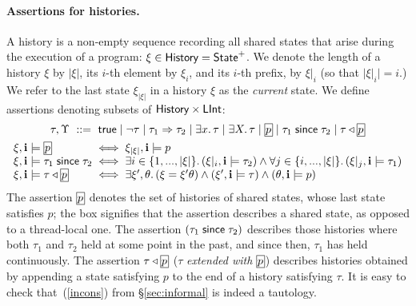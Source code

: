 \paragraph{Assertions for histories.}  A history is a non-empty sequence
recording all shared states that arise during the execution of a program: $\xi
\in \textsf{History} = {\sf State}^+$.  We denote the length of a history $\xi$ by $|\xi|$,
its $i$-th element by $\xi_i$, and its $i$-th prefix, by $\xi|_i$ (so that
$\big|\xi|_i\big|=i$.)  We refer to the last state $\xi_{|\xi|}$ in a history
$\xi$ as the \emph{current} state.
We define assertions denoting subsets of $\textsf{History} \times {\sf LInt}$:
$$
\begin{array}{@{}l@{\;}c@{\;}l@{}}
\multicolumn{3}{@{}c@{}}{
\tau, \Upsilon 
\ ::= \
\true \mid \neg\tau \mid \tau_1 \Rightarrow \tau_2 \mid
\exists x.\,\tau 
\mid \exists X.\,\tau \mid \shareds{p} \mid
\tau_1 \since \tau_2 \mid \tau \extend \shareds{p}
}
\\[1ex]
\xi, \intp \models \shareds{p} 
& \iff & 
\xi_{|\xi|}, \intp \models p
\\
\xi, \intp \models \tau_1 \since \tau_2  
& \iff &
\exists i \in \{1, ..., |\xi|\}.\, (\xi|_i, \intp \models \tau_2)  
\land
\forall j \in \{ i, ...,|\xi|\}.\, (\xi|_j, \intp \models \tau_1)\\
\xi, \intp \models \tau \extend \shareds{p} 
& \iff &
\exists \xi',\theta.\,
(\xi = \xi'\theta) \land (\xi', \intp \models \tau) \land
(\theta,\intp \models p)
\end{array}
$$
% 
The assertion $\shareds{p}$ denotes the set of histories of shared states, whose
last state satisfies $p$; the box signifies that the assertion
describes a shared state, as opposed to a thread-local one. The assertion
$(\tau_1 \;\mathsf{since}\; \tau_2)$ describes those histories where both $\tau_1$ and
$\tau_2$ held at some point in the past, and since then, $\tau_1$ has held
continuously.
The assertion $\tau \extend \shareds{p}$ ($\tau$ \emph{extended with}
$\shareds{p}$) describes histories obtained by appending a state satisfying $p$
to the end of a history satisfying $\tau$.  It is easy to check
that~(\ref{incons}) from \S\ref{sec:informal} is indeed a tautology.

